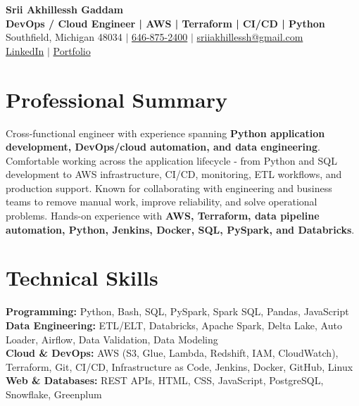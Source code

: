 \documentclass[letterpaper,10pt]{article}
\begin{document}
\fontsize{9.35pt}{10.45pt}\selectfont

\begin{center}
    {\LARGE \textbf{Srii Akhillessh Gaddam}} \\[-1pt]
    \textbf{DevOps / Cloud Engineer | AWS | Terraform | CI/CD | Python} \\[2pt]
    Southfield, Michigan 48034 $|$
    \href{tel:6468752400}{646-875-2400} $|$
    \href{mailto:sriiakhillessh@gmail.com}{sriiakhillessh@gmail.com} \\[1pt]
    \href{https://www.linkedin.com/in/srii-akhiilessh-gaddam-b48668191/}{LinkedIn} $|$
    \href{https://sriiakhillesshg.github.io/portfolio/}{Portfolio}
\end{center}
\vspace{-8pt}

\section{Professional Summary}
\small{Cross-functional engineer with experience spanning \textbf{Python application development, DevOps/cloud automation, and data engineering}. Comfortable working across the application lifecycle - from Python and SQL development to AWS infrastructure, CI/CD, monitoring, ETL workflows, and production support. Known for collaborating with engineering and business teams to remove manual work, improve reliability, and solve operational problems. Hands-on experience with \textbf{AWS, Terraform, data pipeline automation, Python, Jenkins, Docker, SQL, PySpark, and Databricks}.}

\section{Technical Skills}
\small{
\textbf{Programming:} Python, Bash, SQL, PySpark, Spark SQL, Pandas, JavaScript \\
\textbf{Data Engineering:} ETL/ELT, Databricks, Apache Spark, Delta Lake, Auto Loader, Airflow, Data Validation, Data Modeling \\
\textbf{Cloud \& DevOps:} AWS (S3, Glue, Lambda, Redshift, IAM, CloudWatch), Terraform, Git, CI/CD, Infrastructure as Code, Jenkins, Docker, GitHub, Linux \\
\textbf{Web \& Databases:} REST APIs, HTML, CSS, JavaScript, PostgreSQL, Snowflake, Greenplum
}
\end{document}
